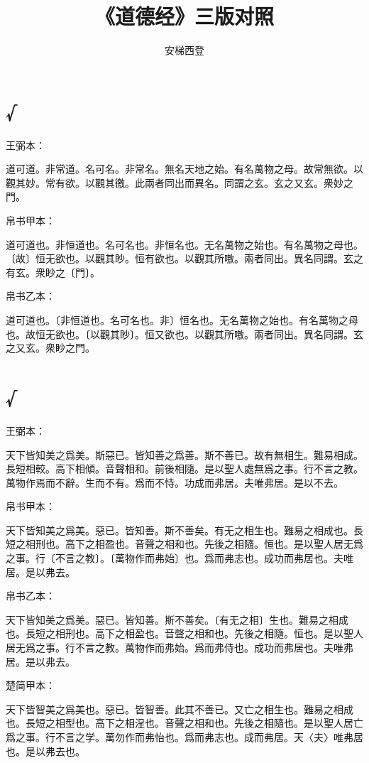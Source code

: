 \documentclass[a5paper]{ctexbook}
\title{《道德经》三版对照}
\author{安梯西登}
\date{}
\begin{document}
    \maketitle

    \tableofcontents

    \chapter{√}
    王弼本：

    道可道。非常道。名可名。非常名。無名天地之始。有名萬物之母。故常無欲。以觀其妙。常有欲。以觀其徼。此兩者同出而異名。同謂之玄。玄之又玄。衆妙之門。

    
    帛书甲本：

    道可道也。非恒道也。名可名也。非恒名也。无名萬物之始也。有名萬物之母也。〔故〕恒无欲也。以觀其眇。恒有欲也。以觀其所噭。兩者同出。異名同謂。玄之有玄。衆眇之〔門〕。

    帛书乙本：

    道可道也。〔非恒道也。名可名也。非〕恒名也。无名萬物之始也。有名萬物之母也。故恒无欲也。〔以觀其眇〕。恒又欲也。以觀其所噭。兩者同出。異名同謂。玄之又玄。衆眇之門。

    \chapter{√}
    王弼本：

    天下皆知美之爲美。斯惡已。皆知善之爲善。斯不善已。故有無相生。難易相成。長短相較。高下相傾。音聲相和。前後相隨。是以聖人處無爲之事。行不言之教。萬物作焉而不辭。生而不有。爲而不恃。功成而弗居。夫唯弗居。是以不去。

    
    帛书甲本：

    天下皆知美之爲美。惡已。皆知善。斯不善矣。有无之相生也。難易之相成也。長短之相刑也。高下之相盈也。音聲之相和也。先後之相隨。恒也。是以聖人居无爲之事。行〔不言之教〕。〔萬物作而弗始〕也。爲而弗志也。成功而弗居也。夫唯居。是以弗去。

    帛书乙本：

    天下皆知美之爲美。惡已。皆知善。斯不善矣。〔有无之相〕生也。難易之相成也。長短之相刑也。高下之相盈也。音聲之相和也。先後之相隨。恒也。是以聖人居无爲之事。行不言之教。萬物作而弗始。爲而弗侍也。成功而弗居也。夫唯弗居。是以弗去。

    楚简甲本：

    天下皆智美之爲美也。惡已。皆智善。此其不善已。又亡之相生也。難易之相成也。長短之相型也。高下之相浧也。音聲之相和也。先後之相隨也。是以聖人居亡爲之事。行不言之学。萬勿作而弗怡也。爲而弗志也。成而弗居。天〈夫〉唯弗居也。是以弗去也。
\end{document}
